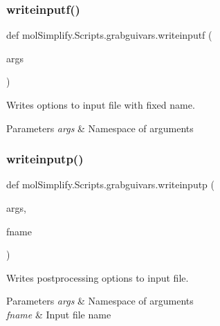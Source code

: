 \subsubsection{\texorpdfstring{writeinputf()}{writeinputf()}}
{\footnotesize\ttfamily def mol\+Simplify.\+Scripts.\+grabguivars.\+writeinputf (\begin{DoxyParamCaption}\item[{}]{args }\end{DoxyParamCaption})}



Writes options to input file with fixed name. 


\begin{DoxyParams}{Parameters}
{\em args} & Namespace of arguments \\
\hline
\end{DoxyParams}
\mbox{\label{namespacemolSimplify_1_1Scripts_1_1grabguivars_a7acd94b8d2ba1e2617dd7aad7baff298}} 
\subsubsection{\texorpdfstring{writeinputp()}{writeinputp()}}
{\footnotesize\ttfamily def mol\+Simplify.\+Scripts.\+grabguivars.\+writeinputp (\begin{DoxyParamCaption}\item[{}]{args,  }\item[{}]{fname }\end{DoxyParamCaption})}



Writes postprocessing options to input file. 


\begin{DoxyParams}{Parameters}
{\em args} & Namespace of arguments \\
\hline
{\em fname} & Input file name \\
\hline
\end{DoxyParams}
